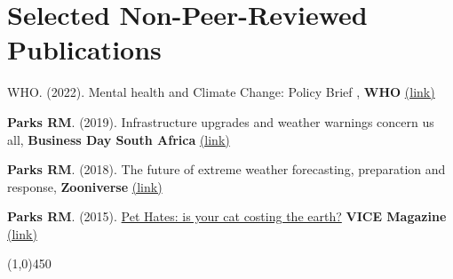 \section*{Selected Non-Peer-Reviewed Publications}

\noindent WHO. (2022). Mental health and Climate Change: Policy Brief
, \textbf{WHO} \href{https://www.who.int/publications/i/item/9789240045125
}{(link)} \medskip

\noindent \textbf{Parks RM}. (2019). Infrastructure upgrades and weather warnings concern us all, \textbf{Business Day South Africa} \href{https://bit.ly/2pyB4Gc}{(link)} \medskip

\noindent \textbf{Parks RM}. (2018). The future of extreme weather forecasting, preparation and response, \textbf{Zooniverse} \href{https://bit.ly/2zfDlHw}{(link)} \medskip

\noindent \textbf{Parks RM}. (2015). \href{https://bit.ly/2FE08nX}{Pet Hates: is your cat costing the earth?} \textbf{VICE Magazine} \href{https://bit.ly/2FE08nX}{(link)}

\begin{center} \line(1,0){450} \end{center}